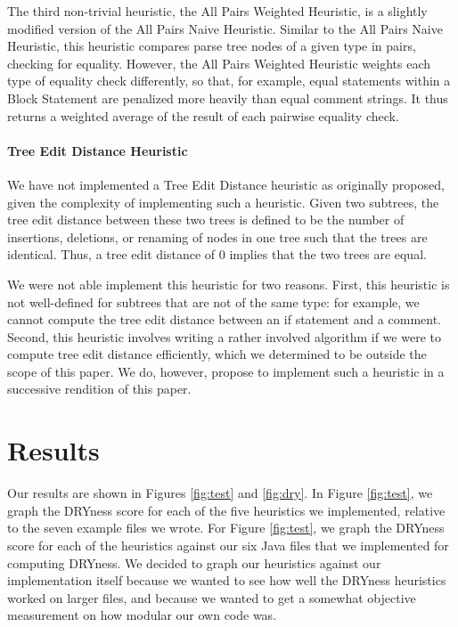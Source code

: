 \documentclass{article}
\begin{document}
The third non-trivial heuristic, the All Pairs Weighted Heuristic, is a slightly modified version of the All Pairs Naive Heuristic.
Similar to the All Pairs Naive Heuristic, this heuristic compares parse tree nodes of a given type in pairs, checking for equality.
However, the All Pairs Weighted Heuristic weights each type of equality check differently, so that, for example, equal statements
within a Block Statement are penalized more heavily than equal comment strings. It thus returns a weighted average of the result
of each pairwise equality check.

\paragraph{Tree Edit Distance Heuristic}
We have not implemented a Tree Edit Distance heuristic as originally proposed, given the complexity of implementing such a heuristic. Given two subtrees, the tree edit distance between these two
trees is defined to be the number of insertions, deletions, or renaming of nodes in one tree such that the trees are
identical\cite{TreeEditDistance}. Thus, a tree edit distance of 0 implies that the two trees are equal.

We were not able implement this heuristic for two reasons. First, this heuristic is not well-defined for subtrees that are not of the same type: for example, we cannot compute the tree edit 
distance between an if statement and a comment. Second, this heuristic involves writing a rather involved algorithm if we were to compute tree edit distance efficiently, which we determined to be outside the scope of this paper. We do, however, propose to implement
such a heuristic in a successive rendition of this paper.

\section{Results}

Our results are shown in Figures \ref{fig:test} and \ref{fig:dry}. In Figure \ref{fig:test}, we graph the DRYness score for each of the five heuristics we implemented, relative to the seven example files we wrote. For Figure \ref{fig:test}, we graph
the DRYness score for each of the heuristics against our six Java files that we implemented for computing DRYness. We decided to
graph our heuristics against our implementation itself because we wanted to see how well the DRYness heuristics worked on larger
files, and because we wanted to get a somewhat objective measurement on how modular our own code was.
\end{document}
